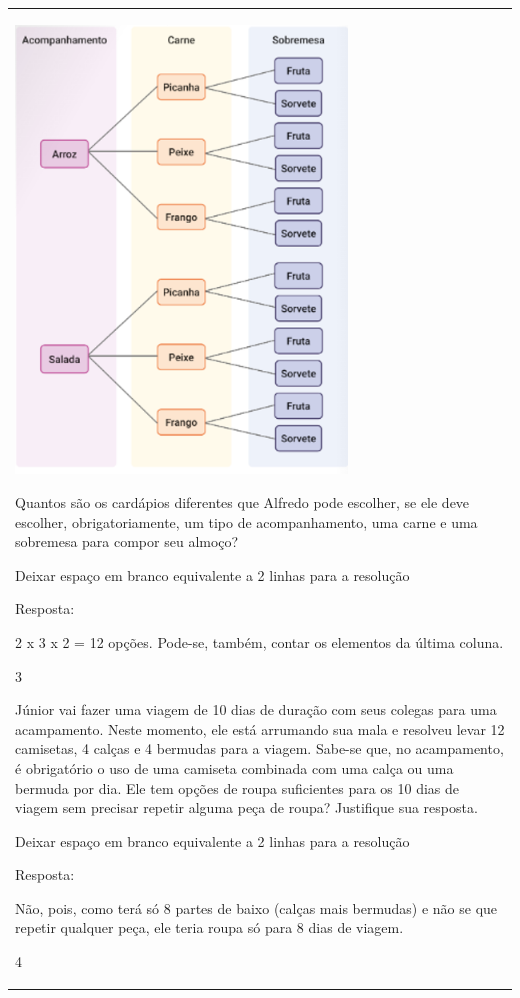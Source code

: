 \begin{mdframed}[linewidth=2pt,linecolor=salmao,roundcorner=2pt]
\begin{escolha}
{{{\begin{longtable}[]{@{}l@{}}
\begin{itemize}
{\includegraphics[width=3.46697in,height=4.68374in]{media/image138.png}

Quantos são os cardápios diferentes que Alfredo pode escolher, se
ele deve escolher, obrigatoriamente, um tipo de acompanhamento, uma
carne e uma sobremesa para compor seu almoço?

Deixar espaço em branco equivalente a 2 linhas para a resolução

Resposta:

2 x 3 x 2 = 12 opções. Pode-se, também, contar os elementos da última coluna.

\num{3}

Júnior vai fazer uma viagem de 10 dias de duração com seus colegas para
uma acampamento. Neste momento, ele está arrumando sua mala e resolveu
levar 12 camisetas, 4 calças e 4 bermudas para a viagem. Sabe-se que, no
acampamento, é obrigatório o uso de uma camiseta combinada com uma calça
ou uma bermuda por dia. Ele tem opções de roupa suficientes para os 10 dias de viagem sem
precisar repetir alguma peça de roupa? Justifique sua resposta.

Deixar espaço em branco equivalente a 2 linhas para a resolução

Resposta:

Não, pois, como terá só 8 partes de baixo (calças mais bermudas) e não se
que repetir qualquer peça, ele teria roupa só para 8 dias de viagem.

\num{4}

}
\end{itemize}
\end{longtable}}}}
\end{escolha}
\end{mdframed}
